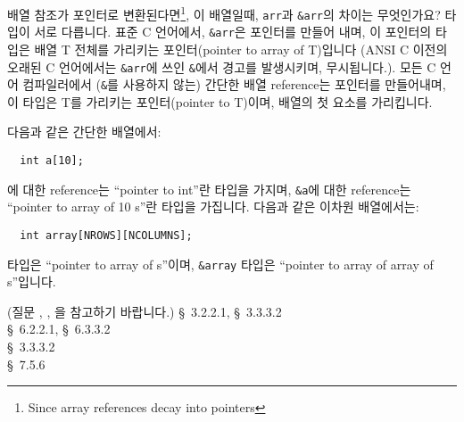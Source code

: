 \begin{faq}
	배열 참조가 포인터로
	변환된다면\footnote{Since array references decay into pointers},
	이 배열일때, \verb+arr+과 \verb+&arr+의 차이는 무엇인가요?
\A
	타입이 서로 다릅니다.
	표준 C 언어에서, \verb+&arr+은 포인터를 만들어 내며, 이 포인터의
	타입은 배열 T 전체를 가리키는 포인터(pointer to array of T)입니다
	(ANSI C 이전의 오래된 C 언어에서는 \verb+&arr+에 쓰인 \verb+&+에서
	경고를 발생시키며, 무시됩니다.). 
	모든 C 언어 컴파일러에서
	(\verb+&+를 사용하지 않는) 간단한 배열 reference는 포인터를 만들어내며,
	이 타입은 T를 가리키는 포인터(pointer to T)이며, 배열의 첫 요소를
	가리킵니다.

	다음과 같은 간단한 배열에서:
\begin{verbatim}
  int a[10];
\end{verbatim}

	\noindent {}에 대한 reference는 ``pointer to int''란 타입을
	가지며, \verb+&a+에 대한 reference는
	``pointer to array of 10 s''란 타입을 가집니다. 다음과 같은
	이차원 배열에서는:
\begin{verbatim}
  int array[NROWS][NCOLUMNS];
\end{verbatim}
	\noindent {} 타입은 ``pointer to array of 
	s''이며, \verb+&array+ 타입은 ``pointer to array of 
	array of  s''입니다.

	(질문 , , 을 참고하기 바랍니다.)
\R
	\cite{ansi} \S\ 3.2.2.1, \S\ 3.3.3.2 \\
	\cite{c89} \S\ 6.2.2.1, \S\ 6.3.3.2 \\
	\cite{rationale} \S\ 3.3.3.2 \\
	\cite{hs} \S\ 7.5.6 
\end{faq}

